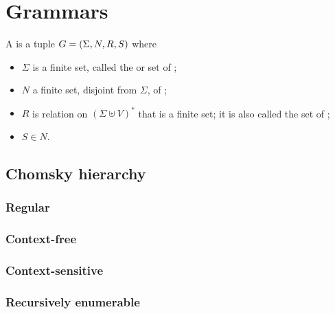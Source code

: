 \section{Grammars}
\begin{definition}
A  is a tuple $G = \left( \Sigma, N, R, S \right)$ where
\begin{itemize}
\item $\Sigma$ is a finite set, called the  or set of ;
\item $N$ a finite set, disjoint from $\Sigma$, of ;
\item $R$ is relation on $(\Sigma \uplus V)^*$ that is a finite set; it is also called the set of ;
\item $S\in N$.
\end{itemize}
\end{definition}

\subsection{Chomsky hierarchy}
\subsubsection{Regular}
\subsubsection{Context-free}
\subsubsection{Context-sensitive}
\subsubsection{Recursively enumerable}


